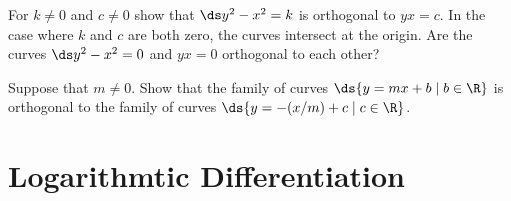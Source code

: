 \begin{exercises}
\begin{exercise} For $k\not= 0$ and $c \neq 0$ show that $\ds y^2 -x^2 =k$ is orthogonal to
$yx =c$. In the case where $k$ and $c$ are both zero, the curves
  intersect at the origin. Are the curves $\ds y^2 -x^2 =0$ and $yx=0$
  orthogonal to each other?
\end{exercise}

\begin{exercise} Suppose that $m\neq 0$. Show that the family of curves
$\ds \{y=mx+b \mid b\in \R \}$ is orthogonal to the
family of curves $\ds \{y=-(x/m)+c \mid c \in \R\}$.
\end{exercise}

\end{exercises}





















\section{Logarithmtic Differentiation}


















